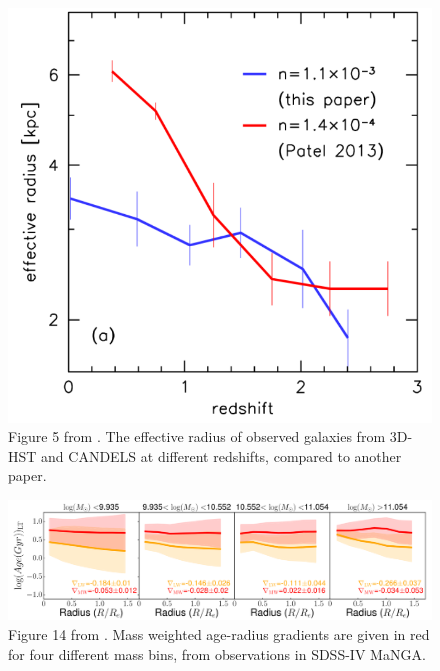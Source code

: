 \documentclass[preprint2]{aastex631}
\begin{document}
\begin{figure}[htb]
    \centering
    \includegraphics[width=\columnwidth]{vandokkum2013_fig5.png}
    \caption{Figure 5 from \citet{vanDokkum+2013}. The effective radius of observed galaxies from 3D-HST and CANDELS at different redshifts, compared to another paper.}
\end{figure}

\begin{figure}[t]
    \centering
    \includegraphics[width=\textwidth]{goddard2017_fig14.png}
    \caption{Figure 14 from \citet{Goddard+2017}. Mass weighted age-radius gradients are given in red for four different mass bins, from observations in SDSS-IV MaNGA.}
\end{figure}
\end{document}
